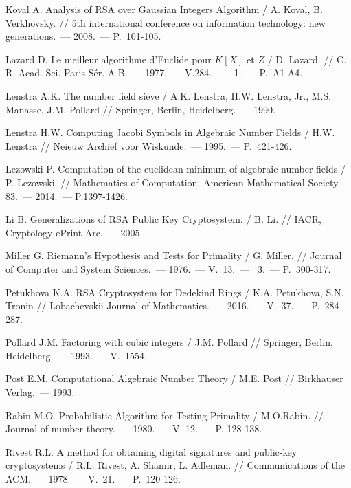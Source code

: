 \begin{thebibliography}{99}
    Koval A. Analysis of RSA over Gaussian Integers Algorithm / A. Koval, B. Verkhovsky. // 5th international conference on information technology: new generations.~--- 2008.~--- {P.}~101-105.
    
    Lazard D. Le meilleur algorithme d'{E}uclide pour {$K[X]$} et {$Z$} / D. Lazard. // C. R. Acad. Sci. Paris S\'er. A-B.~--- 1977.~--- V.284.~--- \textnumero~1.~--- P.~A1-A4.
    
    Lenstra A.K. The number field sieve / A.K. Lenstra, H.W. Lenstra, Jr., M.S. Manasse, J.M. Pollard // Springer, Berlin, Heidelberg.~--- 1990.

    Lenstra H.W. Computing Jacobi Symbols in Algebraic Number Fields / H.W. Lenstra // Neieuw Archief voor Wiskunde.~--- 1995.~--- P.~421-426.

    Lezowski P. Computation of the euclidean minimum of algebraic number fields / P. Lezowski. // Mathematics of Computation, American Mathematical Society 83.~--- 2014.~--- P.1397-1426.

    Li B. Generalizations of RSA Public Key Cryptosystem. / B. Li. // IACR, Cryptology ePrint Arc.~--- 2005.

    Miller G. Riemann's Hypothesis and Tests for Primality / G. Miller. // Journal of Computer and System Sciences.~--- 1976.~--- V.~13.~--- ~3.~--- {P.}~300-317.
    
    Petukhova K.A. RSA Cryptosystem for Dedekind Rings / K.A. Petukhova, S.N. Tronin // Lobachevskii Journal of Mathematics.~--- 2016.~--- V.~37.~--- P.~284-287.
    
    Pollard J.M. Factoring with cubic integers / J.M. Pollard // Springer, Berlin, Heidelberg.~--- 1993.~--- V.~1554.

    Post E.M. Computational Algebraic Number Theory / M.E. Post // Birkhauser Verlag.~--- 1993.

    Rabin M.O. Probabilistic Algorithm for Testing Primality / M.O.Rabin. // Journal of number theory.~--- 1980.~--- V. 12.~--- P. 128-138.
    
    Rivest R.L. A method for obtaining digital signatures and public-key cryptosystems / R.L. Rivest, A. Shamir, L. Adleman. // Communications of the ACM.~--- 1978.~--- V.~21.~--- P.~120-126.
    

\end{thebibliography}

